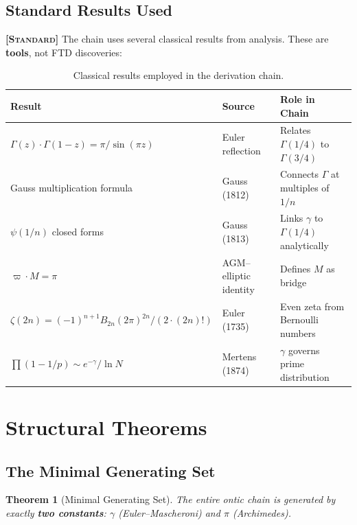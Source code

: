 \documentclass[11pt, letterpaper]{article}
\newtheorem{theorem}{Theorem}[section]
\theoremstyle{definition}
\theoremstyle{remark}
\newcommand{\epi}[1]{\textbf{\textsc{[#1]}}}
\begin{document}
\subsection{Standard Results Used}

\epi{Standard} The chain uses several classical results from analysis. These are \textbf{tools}, not FTD discoveries:

\begin{table}[h]
\centering
\small
\begin{tabular}{@{}lll@{}}
\toprule
\textbf{Result} & \textbf{Source} & \textbf{Role in Chain} \\
\midrule
$\Gamma(z)\cdot\Gamma(1-z) = \pi/\sin(\pi z)$ & Euler reflection & Relates $\Gamma(1/4)$ to $\Gamma(3/4)$ \\
Gauss multiplication formula & Gauss (1812) & Connects $\Gamma$ at multiples of $1/n$ \\
$\psi(1/n)$ closed forms & Gauss (1813) & Links $\gamma$ to $\Gamma(1/4)$ analytically \\
$\varpi \cdot M = \pi$ & AGM--elliptic identity & Defines $M$ as bridge \\
$\zeta(2n) = (-1)^{n+1}B_{2n}(2\pi)^{2n}/(2\cdot(2n)!)$ & Euler (1735) & Even zeta from Bernoulli numbers \\
$\prod(1-1/p) \sim e^{-\gamma}/\ln N$ & Mertens (1874) & $\gamma$ governs prime distribution \\
\bottomrule
\end{tabular}
\caption{Classical results employed in the derivation chain.}
\end{table}

\section{Structural Theorems}

\subsection{The Minimal Generating Set}

\begin{theorem}[Minimal Generating Set]
The entire ontic chain is generated by exactly \textbf{two constants}: $\gamma$ (Euler--Mascheroni) and $\pi$ (Archimedes).
\end{theorem}
\end{document}
